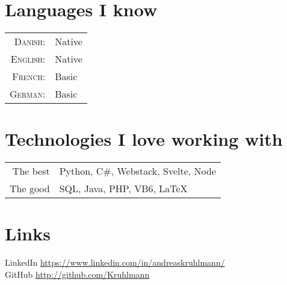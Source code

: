 \documentclass[a4paper,10pt]{article}
\begin{document}
\section{Languages I know}
\begin{tabular}{rl}
 \textsc{Danish:}&Native\\
\textsc{English:}&Native\\
\textsc{French:}&Basic\\
\textsc{German:}&Basic\\
\end{tabular}

\section{Technologies I love working with}
\begin{tabular}{rl}
 The best & Python, C\#, Webstack, Svelte, Node\\
 The good & SQL, Java, PHP, VB6, \LaTeX
\end{tabular}

\section{Links}
LinkedIn \href{https://www.linkedin.com/in/andreaskruhlmann/}{https://www.linkedin.com/in/andreaskruhlmann/}\\
GitHub  \href{https://github.com/Kruhlmann}{http://github.com/Kruhlmann}
\end{document}
